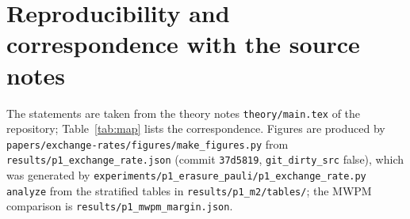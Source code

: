 \documentclass[11pt,a4paper]{article}
\theoremstyle{plain}
\theoremstyle{definition}
\theoremstyle{remark}
\begin{document}
\section{Reproducibility and correspondence with the source notes}\label{app:repro}

The statements are taken from the theory notes \texttt{theory/main.tex} of the repository; Table~\ref{tab:map} lists the correspondence. Figures are produced by \texttt{papers/exchange-rates/figures/make\_figures.py} from \texttt{results/p1\_exchange\_rate.json} (commit \texttt{37d5819}, \texttt{git\_dirty\_src} false), which was generated by \texttt{experiments/p1\_erasure\_pauli/p1\_exchange\_rate.py analyze} from the stratified tables in \texttt{results/p1\_m2/tables/}; the MWPM comparison is \texttt{results/p1\_mwpm\_margin.json}.
\end{document}
